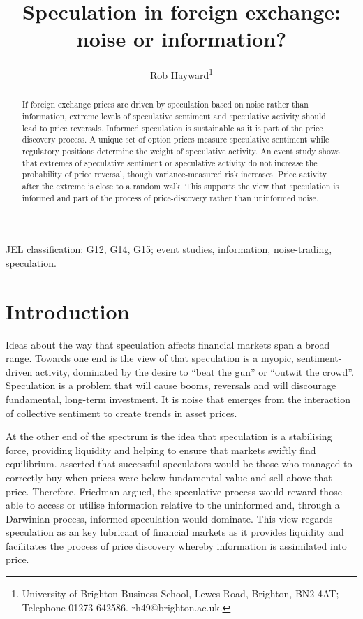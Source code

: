 \documentclass[preprint,12pt,authoryear]{elsarticle}
\begin{document}
\begin{frontmatter}
\title{Speculation in foreign exchange: noise or information?}
\author{Rob Hayward\footnote{University of Brighton Business School, Lewes Road, Brighton, BN2 4AT; Telephone 01273 642586.  rh49@brighton.ac.uk.}}

\begin{abstract}
If foreign exchange prices are driven by speculation based on noise rather than information, extreme levels of speculative sentiment and speculative activity should lead to price reversals. Informed speculation is sustainable as it is part of the price discovery process. A unique set of option prices measure speculative sentiment while regulatory positions determine the weight of speculative activity.  An event study shows that extremes of speculative sentiment or speculative activity do not increase the probability of price reversal, though variance-measured risk increases.  Price activity after the extreme is close to a random walk. This supports the view that speculation is informed and part of the process of price-discovery rather than uninformed noise.      
\end{abstract}
\begin{keyword}
JEL classification: G12, G14, G15; event studies, information, noise-trading, speculation.
\end{keyword}

\end{frontmatter}
\section*{Introduction}
Ideas about the way that speculation affects financial markets span a broad range.  Towards one end is the view of \citet[p. 101]{Keynes1936} that speculation is a myopic, sentiment-driven activity, dominated by the desire to ``beat the gun'' or  ``outwit the crowd''. Speculation is a problem that will cause booms, reversals and will discourage fundamental, long-term investment. It is noise that emerges from the interaction of collective sentiment to create trends in asset prices. 

At the other end of the spectrum is the idea that speculation is a stabilising force, providing liquidity and helping to ensure that markets swiftly find equilibrium. \citet{FriedmanPositive} asserted that successful speculators would be those who managed to correctly buy when prices  were below fundamental value and sell above that price. Therefore, Friedman argued, the speculative process would reward those able to access or utilise information relative to the uninformed and, through a Darwinian process, informed speculation would dominate.  This view regards speculation as an key lubricant of financial markets as it provides liquidity and facilitates the process of price discovery whereby information is assimilated into price.   
\end{document}
